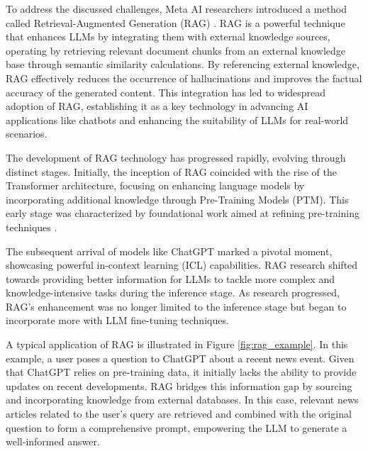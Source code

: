 To address the discussed challenges, Meta AI researchers introduced a method called Retrieval-Augmented Generation (RAG) \cite{lewis2020retrieval}. RAG is a powerful technique that enhances LLMs by integrating them with external knowledge sources, operating by retrieving relevant document chunks from an external knowledge base through semantic similarity calculations. By referencing external knowledge, RAG effectively reduces the occurrence of hallucinations and improves the factual accuracy of the generated content. This integration has led to widespread adoption of RAG, establishing it as a key technology in advancing AI applications like chatbots and enhancing the suitability of LLMs for real-world scenarios.

The development of RAG technology has progressed rapidly, evolving through distinct stages. Initially, the inception of RAG coincided with the rise of the Transformer architecture, focusing on enhancing language models by incorporating additional knowledge through Pre-Training Models (PTM). This early stage was characterized by foundational work aimed at refining pre-training techniques \cite{arora2023gar, lewis2020retrieval, borgeaud2022improving}. 

The subsequent arrival of models like ChatGPT marked a pivotal moment, showcasing powerful in-context learning (ICL) capabilities. RAG research shifted towards providing better information for LLMs to tackle more complex and knowledge-intensive tasks during the inference stage. As research progressed, RAG's enhancement was no longer limited to the inference stage but began to incorporate more with LLM fine-tuning techniques.

A typical application of RAG is illustrated in Figure \ref{fig:rag_example}. In this example, a user poses a question to ChatGPT about a recent news event. Given that ChatGPT relies on pre-training data, it initially lacks the ability to provide updates on recent developments. RAG bridges this information gap by sourcing and incorporating knowledge from external databases. In this case, relevant news articles related to the user's query are retrieved and combined with the original question to form a comprehensive prompt, empowering the LLM to generate a well-informed answer.

